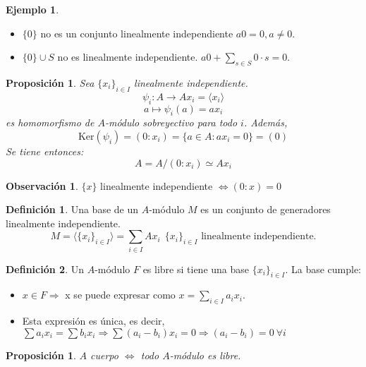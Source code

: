 \documentclass{article}
\theoremstyle{theorem-style}  %
\newtheorem{proposition}[theorem]{Proposición}
\theoremstyle{definition}
\newtheorem{definition}{Definición}[section]
\newtheorem*{observation}{Observación} %
\theoremstyle{example-style}
\newtheorem{example}{Ejemplo}[section]
\begin{document}
	\begin{example}
		\
		\begin{itemize}
			\item $ \{0\} $ no es un conjunto linealmente independiente $ a0=0, a\neq 0$.
			\item $ \{0\} \cup S$ no es linealmente independiente.	$ a0+\sum_{s\in S}0\cdot s =0 $.
		\end{itemize}
	\end{example}

	\begin{proposition}\label{prop:a=axi}
		Sea $ \{x_i\}_{i\in I} $ linealmente independiente.
		\[ \psi_i:A\longrightarrow Ax_i=\langle x_i\rangle \]
		\[ a\longmapsto \psi_i(a)=ax_i \]
		es homomorfismo de $A$-módulo sobreyectivo para todo $i$. Además,
		\[ \text{Ker}(\psi_i)=(0:x_i)=\{a\in A : ax_i=0\}=(0) \]
		Se tiene entonces:
		\[ A=A/(0:x_i)\simeq Ax_i \]
	\end{proposition}

	\begin{observation}
		$ \{x\} $ linealmente independiente $ \Leftrightarrow (0:x)=0$ 
	\end{observation} 

	\begin{definition} Una base de un $ A $-módulo $ M $ es un conjunto de generadores linealmente independiente.  \[ M=\langle \{x_i\}_{i\in I}\rangle=\sum_{i\in I} Ax_i\ \  \{x_i\}_{i\in I} \text{ linealmente independiente.} \] 
	\end{definition}
		
	\begin{definition}
		Un $ A $-módulo $ F $ es libre si tiene una base $\{x_i\}_{i\in I}$. La base cumple:
		\begin{itemize}
			\item $x\in F\Rightarrow$ x se puede expresar como $x=\sum_{i\in I}a_i x_i$.
			\item Esta expresión es única, es decir, $\sum a_i x_i=\sum b_i x_i \Rightarrow \sum (a_i-b_i)x_i=0\Rightarrow (a_i-b_i)=0 \ \forall i$
		\end{itemize}
	\end{definition}

	\begin{proposition}
		$ A $ cuerpo $ \Leftrightarrow $ todo $ A $-módulo es libre.
	\end{proposition}
\end{document}
